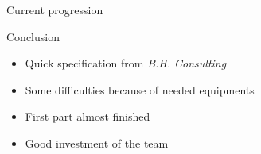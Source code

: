 \documentclass[12pt]{beamer}
\begin{document}
\begin{frame}{Current progression}
\end{frame}


\begin{frame}{Conclusion}
    \begin{itemize}
	\item<1->Quick specification from \emph{B.H. Consulting}
	\vfill
	\item<2->Some difficulties because of needed equipments
	\vfill
	\item<3->First part almost finished
	\vfill
	\item<4->Good investment of the team
    \end{itemize}
\end{frame}
\end{document}
